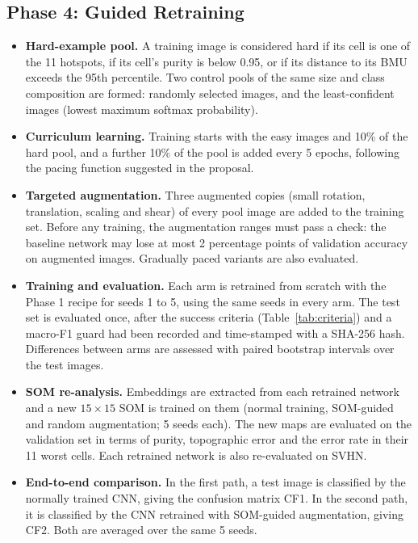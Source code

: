 \documentclass{scrartcl}
\begin{document}
\subsection{Phase 4: Guided Retraining}

\begin{itemize}
  \item \textbf{Hard-example pool.} A training image is considered hard if its cell is one of the 11 hotspots, if its cell's purity is below 0.95, or if its distance to its BMU exceeds the 95th percentile. Two control pools of the same size and class composition are formed: randomly selected images, and the least-confident images (lowest maximum softmax probability).
  \item \textbf{Curriculum learning.} Training starts with the easy images and 10\% of the hard pool, and a further 10\% of the pool is added every 5 epochs, following the pacing function suggested in the proposal.
  \item \textbf{Targeted augmentation.} Three augmented copies (small rotation, translation, scaling and shear) of every pool image are added to the training set. Before any training, the augmentation ranges must pass a check: the baseline network may lose at most 2 percentage points of validation accuracy on augmented images. Gradually paced variants are also evaluated.
  \item \textbf{Training and evaluation.} Each arm is retrained from scratch with the Phase 1 recipe for seeds 1 to 5, using the same seeds in every arm. The test set is evaluated once, after the success criteria (Table~\ref{tab:criteria}) and a macro-F1 guard had been recorded and time-stamped with a SHA-256 hash. Differences between arms are assessed with paired bootstrap intervals over the test images.
  \item \textbf{SOM re-analysis.} Embeddings are extracted from each retrained network and a new $15\times15$ SOM is trained on them (normal training, SOM-guided and random augmentation; 5 seeds each). The new maps are evaluated on the validation set in terms of purity, topographic error and the error rate in their 11 worst cells. Each retrained network is also re-evaluated on SVHN.
  \item \textbf{End-to-end comparison.} In the first path, a test image is classified by the normally trained CNN, giving the confusion matrix CF1. In the second path, it is classified by the CNN retrained with SOM-guided augmentation, giving CF2. Both are averaged over the same 5 seeds.
\end{itemize}
\end{document}
